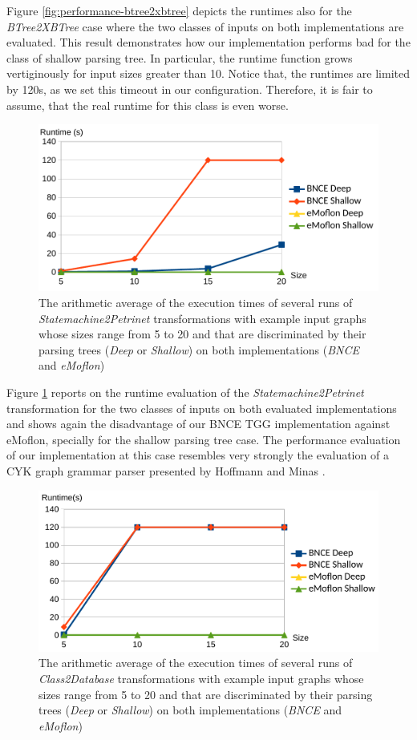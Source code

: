 Figure \ref{fig:performance-btree2xbtree} depicts the runtimes also for the \emph{BTree2XBTree} case where the two classes of inputs on both implementations are evaluated. This result demonstrates how our implementation performs bad for the class of shallow parsing tree. In particular, the runtime function grows vertiginously for input sizes greater than 10. Notice that, the runtimes are limited by 120s, as we set this timeout in our configuration. Therefore, it is fair to assume, that the real runtime for this class is even worse.

\begin{figure}
	\centering
	\includegraphics[width=.6\textwidth]{figures/performance/statemachine2petrinet}
	\caption{The arithmetic average of the execution times of several runs of \emph{Statemachine2Petrinet} transformations with example input graphs whose sizes range from 5 to 20 and that are discriminated by their parsing trees (\emph{Deep} or \emph{Shallow}) on both implementations (\emph{BNCE} and \emph{eMoflon})}
	\label{fig:performance-statemachine2petrinet}
\end{figure}

Figure \ref{fig:performance-statemachine2petrinet} reports on the runtime evaluation of the \emph{Statemachine2Petrinet} transformation for the two classes of inputs on both evaluated implementations and shows again the disadvantage of our BNCE TGG implementation against eMoflon, specially for the shallow parsing tree case. The performance evaluation of our implementation at this case resembles very strongly the evaluation of a CYK graph grammar parser presented by Hoffmann and Minas \cite[p. 83-90]{hoffmann2017generating}.

\begin{figure}
	\centering
	\includegraphics[width=.6\textwidth]{figures/performance/class2database}
	\caption{The arithmetic average of the execution times of several runs of \emph{Class2Database} transformations with example input graphs whose sizes range from 5 to 20 and that are discriminated by their parsing trees (\emph{Deep} or \emph{Shallow}) on both implementations (\emph{BNCE} and \emph{eMoflon})}
	\label{fig:performance-class2database}
\end{figure}

